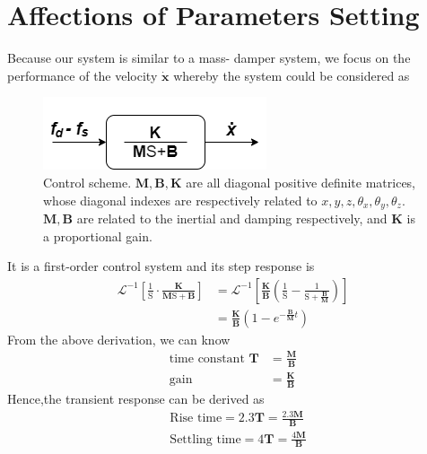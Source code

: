 \section{Affections of Parameters Setting}
\label{sec:affection}
Because our system is similar to a mass- damper system, we focus on the performance of the velocity $\boldsymbol{\dot{x}}$ whereby the system could be considered as
\begin{figure}[htbp]
\begin{center}
\includegraphics[width=0.6\linewidth]{Images/mass spring.png}
\end{center}
\caption{
Control scheme. $\mathbf{M},\mathbf{B},\mathbf{K}$ are all diagonal positive definite matrices, whose diagonal indexes are respectively related to $x,y,z,\theta_x,\theta_y,\theta_z$. $\mathbf{M},\mathbf{B}$ are related to the inertial and damping respectively, and $\mathbf{K}$ is a proportional gain. 
}\label{fig:mass spring}
\end{figure}
\par\noindent
It is a first-order control system and its step response is 
\begin{equation}
\begin{split}
\mathcal{L}^{-1} \left[ \frac{1}{\mathrm{S}} \cdot \frac{\mathbf{K}}{\mathbf{M}\mathrm{S}+\mathbf{B}} \right] 
&= \mathcal{L}^{-1} \left[ \frac{\mathbf{K}}{\mathbf{B}} \left( \frac{1}{\mathrm{S}} - \frac{1}{\mathrm{S}+\frac{\mathbf{B}}{\mathbf{M}}} \right) \right] \\
&= \frac{\mathbf{K}}{\mathbf{B}} \left(1 - e^{- \frac{\mathbf{B}}{\mathbf{M}} t}  \right)
\end{split}
\end{equation}
From the above derivation, we can know 
\begin{equation}
\begin{split}
\text{time constant } \mathbf{T} &= \frac{\mathbf{M}}{\mathbf{B}}\\
\text{gain} &= \frac{\mathbf{K}}{\mathbf{B}}
\end{split}
\end{equation}
Hence,the transient response can be derived as 
\begin{equation}
\begin{split}
&\text{Rise time} = 2.3\mathbf{T} = \frac{2.3 \mathbf{M}}{\mathbf{B}}\\
&\text{Settling time} = 4\mathbf{T} =  \frac{4 \mathbf{M}}{\mathbf{B}}\\
\end{split}
\end{equation}
